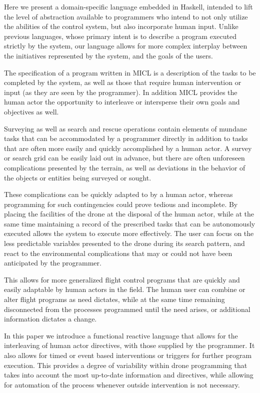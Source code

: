 \documentclass{sig-alternate-05-2015}
\begin{document}
Here we present a domain-specific language embedded in Haskell, intended to
lift the level of abstraction available to programmers who intend to not only
utilize the abilities of the control system, but also incorporate human
input. Unlike previous languages, whose primary intent is to describe a
program executed strictly by the system, our language allows for more complex
interplay between the initiatives represented by the system, and the goals
of the users.

The specification of a program written in MICL is a description of the
tasks to be completed by the system, as well as those that require human
intervention or input (as they are seen by the programmer). In addition
MICL provides the human actor the opportunity to interleave or
intersperse their own goals and objectives as well.

Surveying as well as search and rescue operations contain elements of mundane
tasks that can be accommodated by a programmer directly in addition to tasks
that are often more easily and quickly accomplished by a human actor. A survey
or search grid can be easily laid out in advance, but there are often
unforeseen complications presented by the terrain, as well as deviations in the
behavior of the objects or entities being surveyed or sought.

These complications can be quickly adapted to by a human actor, whereas
programming for such contingencies could prove tedious and incomplete. By
placing the facilities of the drone at the disposal of the human actor, while
at the same time maintaining a record of the prescribed tasks that can be
autonomously executed allows the system to execute more effectively. The user
can focus on the less predictable variables presented to the drone during its
search pattern, and react to the environmental complications that may or could
not have been anticipated by the programmer.

This allows for more generalized flight control programs that are quickly and
easily adaptable by human actors in the field. The human user can combine or
alter flight programs as need dictates, while at the same time remaining
disconnected from the processes programmed until the need arises, or
additional information dictates a change.

In this paper we introduce a functional reactive language that allows for the
interleaving of human actor directives, with those supplied by the
programmer. It also allows for timed or event based interventions or triggers
for further program execution. This provides a degree of variability within
drone programming that takes into account the most up-to-date information and
directives, while allowing for automation of the process whenever outside
intervention is not necessary.
\end{document}
